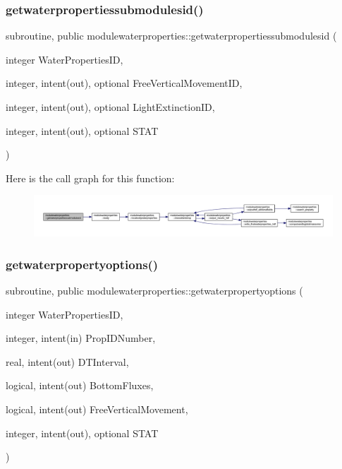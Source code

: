\subsubsection{\texorpdfstring{getwaterpropertiessubmodulesid()}{getwaterpropertiessubmodulesid()}}
{\footnotesize\ttfamily subroutine, public modulewaterproperties\+::getwaterpropertiessubmodulesid (\begin{DoxyParamCaption}\item[{integer}]{Water\+Properties\+ID,  }\item[{integer, intent(out), optional}]{Free\+Vertical\+Movement\+ID,  }\item[{integer, intent(out), optional}]{Light\+Extinction\+ID,  }\item[{integer, intent(out), optional}]{S\+T\+AT }\end{DoxyParamCaption})}

Here is the call graph for this function\+:\nopagebreak
\begin{figure}[H]
\begin{center}
\leavevmode
\includegraphics[width=350pt]{namespacemodulewaterproperties_aa92bc10cfb8ceb9e3edd659ae8e6ed71_cgraph}
\end{center}
\end{figure}
\mbox{\label{namespacemodulewaterproperties_aab0b283f67aa51240519cab03610aab7}} 
\subsubsection{\texorpdfstring{getwaterpropertyoptions()}{getwaterpropertyoptions()}}
{\footnotesize\ttfamily subroutine, public modulewaterproperties\+::getwaterpropertyoptions (\begin{DoxyParamCaption}\item[{integer}]{Water\+Properties\+ID,  }\item[{integer, intent(in)}]{Prop\+I\+D\+Number,  }\item[{real, intent(out)}]{D\+T\+Interval,  }\item[{logical, intent(out)}]{Bottom\+Fluxes,  }\item[{logical, intent(out)}]{Free\+Vertical\+Movement,  }\item[{integer, intent(out), optional}]{S\+T\+AT }\end{DoxyParamCaption})}

